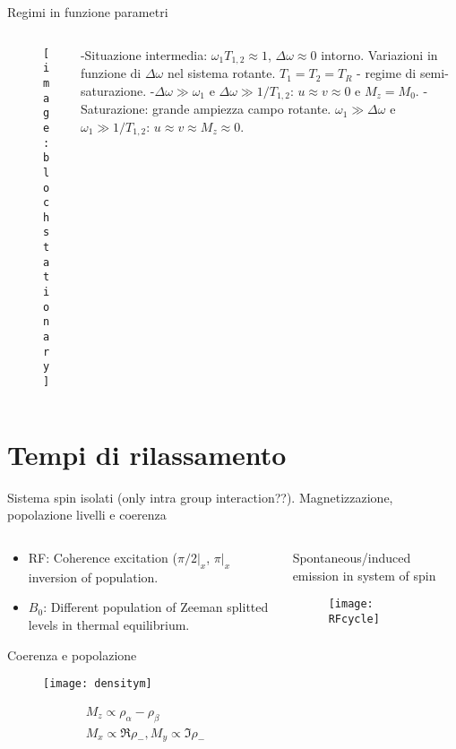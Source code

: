 \begin{frame}{Regimi in funzione parametri}
\begin{columns}[T]
\begin{column}{0.5\textwidth}
\begin{figure}
    \centering
    \texttt{[image: blochstationary]}
    \label{fig:blochstationary}
\end{figure}
\end{column}
\begin{column}{0.5\textwidth}
-Situazione intermedia: $\omega_1T_{1,2}\approx1$, $\Delta\omega\approx0$ intorno.
Variazioni in funzione di $\Delta\omega$ nel sistema rotante. $T_1=T_2=T_R$ - regime di semi-saturazione.
-$\Delta\omega\gg\omega_1$ e $\Delta\omega\gg1/T_{1,2}$: $u\approx v\approx 0$ e $M_z=M_0$.
- Saturazione: grande ampiezza campo rotante. $\omega_1\gg\Delta\omega$ e $\omega_1\gg1/T_{1,2}$: $u\approx v\approx M_z\approx0$.
\end{column}
\end{columns}
\end{frame}

\section{Tempi di rilassamento}

\begin{frame}{Sistema spin isolati (only intra group interaction??). Magnetizzazione, popolazione livelli e coerenza}
\begin{columns}[T]
\begin{column}{0.5\textwidth}
\begin{itemize}
\item RF: Coherence excitation ($\pi/2|_x$, $\pi|_x$ inversion of population.
\item $B_0$: Different population of Zeeman splitted levels in thermal equilibrium.
\end{itemize}
\begin{block}{Coerenza e popolazione}
\begin{figure}
    \centering
    \texttt{[image: densitym]}
    \label{fig:densitym}
\end{figure}
\begin{align*}
&M_z\propto\rho_{\alpha}-\rho_{\beta}\\
&M_x\propto\Re{\rho_-}, M_y\propto\Im{\rho_-}
\end{align*}

\end{block}
\end{column}
\begin{column}{0.5\textwidth}
\begin{block}{Spontaneous/induced emission in system of spin}
\begin{figure}[!ht]\texttt{[image: RFcycle]}\label{fig:RFcycle}\end{figure}
\end{block}
\end{column}
\end{columns}
\end{frame}

